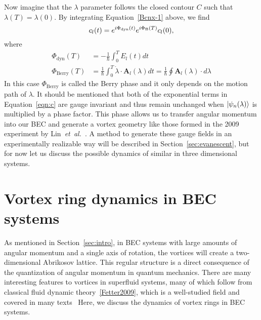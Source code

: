 Now imagine that the $\lambda$ parameter follows the closed contour $C$ such that $\lambda(T) = \lambda(0)$. 
By integrating Equation~\eqref{Bcnx-1} above, we find
\begin{equation}
c_l(t) = e^{i \Phi_{\text{dyn}}(t)}e^{i\Phi_{\text B}(T)}c_l(0),
\label{eqn:c}
\end{equation}
where
\begin{equation}
\begin{split}
\Phi_{\text{dyn}}(T) &= - \frac{1}{\hbar}\int_0^TE_l(t)dt \\
\Phi_{\text{Berry}} (T)&= \frac{1}{\hbar} \int_0 ^T \dot{\lambda} \cdot \mathbf{A}_l(\lambda)dt = \frac{1}{\hbar}\oint\mathbf{A}_l(\lambda) \cdot d\lambda
\end{split}
\end{equation}
In this case $\Phi_{\text{Berry}}$ is called the Berry phase and it only depends on the motion path of $\lambda$. 
It should be mentioned that both of the exponential terms in Equation~\eqref{eqn:c} are gauge invariant and thus remain unchanged when $\ket{\psi_n(\lambda)}$ is multiplied by a phase factor.
This phase allows us to transfer angular momentum into our BEC and generate a vortex geometry like those formed in the 2009 experiment by Lin~\textit{et~al.}~\cite{Lin2009}.
A method to generate these gauge fields in an experimentally realizable way will be described in Section~\ref{sec:evanescent}, but for now let us discuss the possible dynamics of similar in three dimensional systems.

\section{Vortex ring dynamics in BEC systems}
\label{sec:vortex}

As mentioned in Section~\ref{sec:intro}, in BEC systems with large amounts of angular momentum and a single axis of rotation, the vortices will create a two-dimensional Abrikosov lattice. 
This regular structure is a direct consequence of the quantization of angular momentum in quantum mechanics.
There are many interesting features to vortices in superfluid systems, many of which follow from classical fluid dynamic theory~\ref{Fetter2009}, which is a well-studied field and covered in many texts~\cite{Faber1995, Kundu2012, Tritton1988, Landau1987}
Here, we discuss the dynamics of vortex rings in BEC systems.

